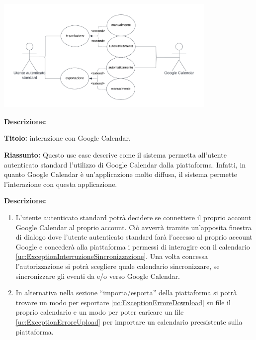 \begin{listaPersonale}[UC]{}




    \newpage


    \begin{center}
        \includegraphics[width=0.8\textwidth]{img/Diagrammi/UseCases/GoogleCalendar.png}
    \end{center}

    \textbf{Descrizione:}

    \textbf{Titolo:} interazione con Google Calendar.

    \textbf{Riassunto:}
    Questo use case descrive come il sistema permetta all'utente autenticato standard l'utilizzo di Google Calendar dalla piattaforma. Infatti, in quanto Google Calendar è un'applicazione molto diffusa, il sistema permette l'interazione con questa applicazione.

    \textbf{Descrizione:}
    \begin{enumerate}
        \item L'utente autenticato standard potrà decidere se connettere il proprio account Google Calendar al proprio account. Ciò avverrà tramite un'apposita finestra di dialogo dove l'utente autenticato standard farà l'accesso al proprio account Google e concederà alla piattaforma i permessi di interagire con il calendario \ref{uc:ExceptionInterruzioneSincronizzazione}. Una volta concessa l'autorizzazione si potrà scegliere quale calendario sincronizzare, se sincronizzare gli eventi da e/o verso Google Calendar.
        \item In alternativa nella sezione “importa/esporta” della piattaforma si potrà trovare un modo per esportare \ref{uc:ExceptionErroreDownload} su file il proprio calendario e un modo per poter caricare un file \ref{uc:ExceptionErroreUpload} per importare un calendario preesistente sulla piattaforma.
    \end{enumerate}


\end{listaPersonale}
